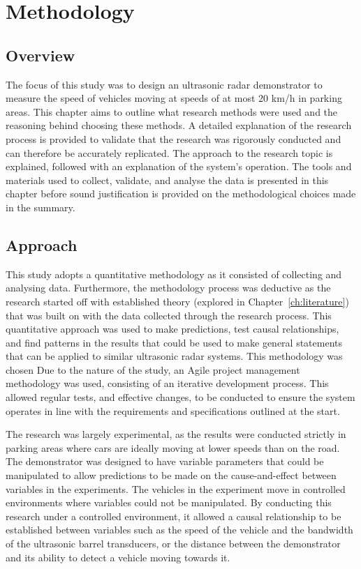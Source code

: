 \documentclass[class=report,11pt,crop=false]{standalone}
\begin{document}
\chapter{Methodology \label{ch:methodology}}
\vspace{-1cm}
\section{Overview}
The focus of this study was to design an ultrasonic radar demonstrator to measure the speed of vehicles moving at speeds of at most 20 km/h in parking areas. This chapter aims to outline what research methods were used and the reasoning behind choosing these methods. A detailed explanation of the research process is provided to validate that the research was rigorously conducted and can therefore be accurately replicated. The approach to the research topic is explained, followed with an explanation of the system's operation. The tools and materials used to collect, validate, and analyse the data is presented in this chapter before sound justification is provided on the methodological choices made in the summary.

\section{Approach}
This study adopts a quantitative methodology as it consisted of collecting and analysing data. Furthermore, the methodology process was deductive as the research started off with established theory (explored in Chapter~\ref{ch:literature}) that was built on with the data collected through the research process. This quantitative approach was used to make predictions, test causal relationships, and find patterns in the results that could be used to make general statements that can be applied to similar ultrasonic radar systems. This methodology was chosen Due to the nature of the study, an Agile project management methodology was used, consisting of an iterative development process. This allowed regular tests, and effective changes, to be conducted to ensure the system operates in line with the requirements and specifications outlined at the start.

The research was largely experimental, as the results were conducted strictly in parking areas where cars are ideally moving at lower speeds than on the road. The demonstrator was designed to have variable parameters that could be manipulated to allow predictions to be made on the cause-and-effect between variables in the experiments. The vehicles in the experiment move in controlled environments where variables could not be manipulated. By conducting this research under a controlled environment, it allowed a causal relationship to be established between variables such as the speed of the vehicle and the bandwidth of the ultrasonic barrel transducers, or the distance between the demonstrator and its ability to detect a vehicle moving towards it.
\end{document}
